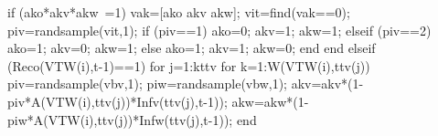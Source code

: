                                                                 if (ako*akv*akw~=1)                                                                    
                                                                       vak=[ako akv akw];
                                                                       vit=find(vak==0); 
                                                                       piv=randsample(vit,1);
                                                                       if (piv==1)
                                                                            ako=0;
                                                                            akv=1;
                                                                            akw=1;
                                                                       elseif (piv==2)
                                                                            ako=1;
                                                                            akv=0;
                                                                            akw=1;
                                                                       else 
                                                                            ako=1;
                                                                            akv=1;
                                                                            akw=0;
                                                                       end                                                                       
                                                                end
                                          elseif (Reco(VTW(i),t-1)==1)
                                                    for j=1:kttv                                                                                                  
                                                          for k=1:W(VTW(i),ttv(j))                                                              
                                                                piv=randsample(vbv,1);
                                                                piw=randsample(vbw,1);
                                                                akv=akv*(1-piv*A(VTW(i),ttv(j))*Infv(ttv(j),t-1));
                                                                akw=akw*(1-piw*A(VTW(i),ttv(j))*Infw(ttv(j),t-1));                                                                 
                                                          end
                                                          
